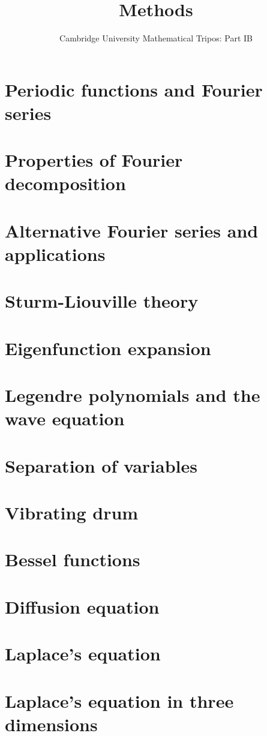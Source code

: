 \documentclass{article}
\title{Methods}
\author{Cambridge University Mathematical Tripos: Part IB}
\begin{document}
\maketitle

\tableofcontentsnewpage{}

\section{Periodic functions and Fourier series}

\section{Properties of Fourier decomposition}

\section{Alternative Fourier series and applications}

\section{Sturm-Liouville theory}

\section{Eigenfunction expansion}

\section{Legendre polynomials and the wave equation}

\section{Separation of variables}

\section{Vibrating drum}

\section{Bessel functions}

\section{Diffusion equation}

\section{Laplace's equation}

\section{Laplace's equation in three dimensions}

\end{document}
